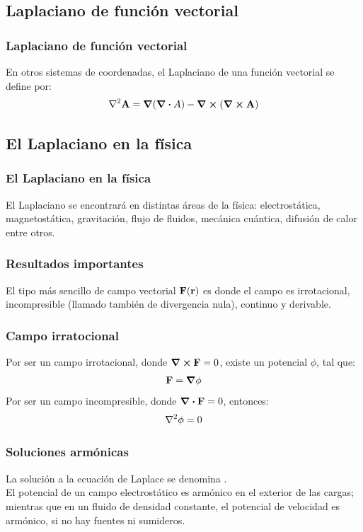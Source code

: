 \documentclass[12pt]{beamer}
\begin{document}
\subsection*{Laplaciano de función vectorial}

\begin{frame}
\frametitle{Laplaciano de función vectorial}
En otros sistemas de coordenadas, el Laplaciano de una función vectorial se define por:
\pause
\begin{align*}
\laplacian{\vb{A}} = \grad{(\div{A})} - \curl{(\curl{\vb{A}})}
\end{align*}
\end{frame}

\subsection{El Laplaciano en la física}

\begin{frame}
\frametitle{El Laplaciano en la física}
El Laplaciano se encontrará en distintas áreas de la física: electrostática, magnetostática, gravitación, flujo de fluidos, mecánica cuántica, difusión de calor entre otros.
\end{frame}
\begin{frame}
\frametitle{Resultados importantes}
El tipo más sencillo de campo vectorial $\vb{F}(\vb{r})$ es donde el campo es irrotacional, incompresible (llamado también de divergencia nula), continuo y derivable.
\end{frame}
\begin{frame}
\frametitle{Campo irratocional}
Por ser un campo irrotacional, donde $\curl{\vb{F}} = 0$, existe un potencial $\phi$, tal que:
\pause
\begin{align*}
\vb{F} = \grad{\phi}
\end{align*}
\pause
Por ser un campo incompresible, donde $\div{\vb{F}} = 0$, entonces:
\pause
\begin{align*}
\laplacian{\phi} = 0
\end{align*}
\end{frame}
\begin{frame}
\frametitle{Soluciones armónicas}
La solución a la ecuación de Laplace se denomina .
\\
\bigskip
\pause
El potencial de un campo electrostático es armónico en el exterior de las cargas; mientras que en un fluido de densidad constante, el potencial de velocidad es armónico, si no hay fuentes ni sumideros.
\end{frame}
\end{document}
